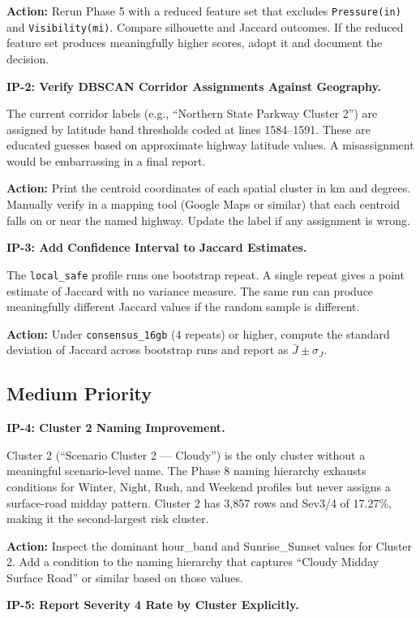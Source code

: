 \documentclass[11pt]{article}
\begin{document}
\textbf{Action:} Rerun Phase 5 with a reduced feature set that excludes
\texttt{Pressure(in)} and \texttt{Visibility(mi)}. Compare silhouette and
Jaccard outcomes. If the reduced feature set produces meaningfully higher
scores, adopt it and document the decision.

\textbf{IP-2: Verify DBSCAN Corridor Assignments Against Geography.}

The current corridor labels (e.g., ``Northern State Parkway Cluster 2'') are
assigned by latitude band thresholds coded at lines 1584--1591. These are
educated guesses based on approximate highway latitude values. A misassignment
would be embarrassing in a final report.

\textbf{Action:} Print the centroid coordinates of each spatial cluster in
km and degrees. Manually verify in a mapping tool (Google Maps or similar)
that each centroid falls on or near the named highway. Update the label
if any assignment is wrong.

\textbf{IP-3: Add Confidence Interval to Jaccard Estimates.}

The \texttt{local\_safe} profile runs one bootstrap repeat. A single repeat
gives a point estimate of Jaccard with no variance measure. The same run
can produce meaningfully different Jaccard values if the random sample is
different.

\textbf{Action:} Under \texttt{consensus\_16gb} (4 repeats) or higher, compute
the standard deviation of Jaccard across bootstrap runs and report as
$\bar{J} \pm \sigma_J$.

\subsection{Medium Priority}

\textbf{IP-4: Cluster 2 Naming Improvement.}

Cluster 2 (``Scenario Cluster 2 --- Cloudy'') is the only cluster without a
meaningful scenario-level name. The Phase 8 naming hierarchy exhausts
conditions for Winter, Night, Rush, and Weekend profiles but never assigns
a surface-road midday pattern. Cluster 2 has 3{,}857 rows and Sev3/4 of
17.27\%, making it the second-largest risk cluster.

\textbf{Action:} Inspect the dominant hour\_band and Sunrise\_Sunset values
for Cluster 2. Add a condition to the naming hierarchy that captures
``Cloudy Midday Surface Road'' or similar based on those values.

\textbf{IP-5: Report Severity 4 Rate by Cluster Explicitly.}
\end{document}
